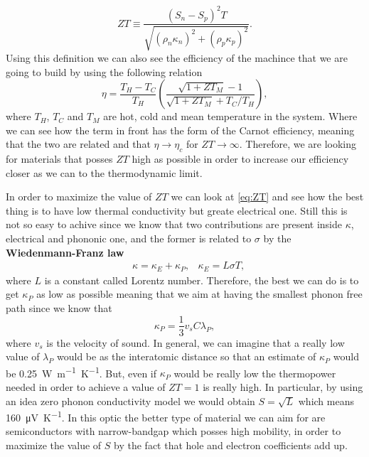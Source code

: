 \begin{equation}
    ZT \equiv \frac{\left( S_n - S_p \right)^2T}{\sqrt{\left( \rho_n\kappa_n \right)^2 + \left( \rho_p\kappa_p \right)^2}}.
\end{equation}
Using this definition we can also see the efficiency of the machince that we are going to build by using the following relation
\begin{equation}
    \eta = \frac{T_H - T_C}{T_H}\left( \frac{\sqrt{1 + ZT_M} - 1}{\sqrt{1 + ZT_M} + T_C/T_H} \right),
\end{equation}
where $T_H$, $T_C$ and $T_M$ are hot, cold and mean temperature in the system. Where we can see how the term in front has the form of the Carnot efficiency, meaning that the two are related and that $\eta \to \eta_{c}$ for $ZT \to \infty$. Therefore, we are looking for materials that posses $ZT$ high as possible in order to increase our efficiency closer as we can to the thermodynamic limit.

In order to maximize the value of $ZT$ we can look at \eqref{eq:ZT} and see how the best thing is to have low thermal conductivity but greate electrical one. Still this is not so easy to achive since we know that two contributions are present inside $\kappa$, electrical and phononic one, and the former is related to $\sigma$ by the \textbf{Wiedenmann-Franz law}
\begin{align}
    &\kappa = \kappa_E + \kappa_P, &\kappa_E = L\sigma T,
\end{align}  
where $L$ is a constant called Lorentz number. Therefore, the best we can do is to get $\kappa_P$ as low as possible meaning that we aim at having the smallest phonon free path since we know that
\begin{equation}
    \kappa_P = \frac{1}{3}v_sC\lambda_{P},
\end{equation}
where $v_s$ is the velocity of sound. In general, we can imagine that a really low value of $\lambda_P$ would be as the interatomic distance so that an estimate of $\kappa_P$ would be \SI{0.25}{W\metre^{-1}\kelvin^{-1}}. But, even if $\kappa_P$ would be really low the thermopower needed in order to achieve a value of $ZT = 1$ is really high. In particular, by using an idea zero phonon conductivity model we would obtain $S = \sqrt{L}$ which means \SI{160}{\micro\volt\kelvin^{-1}}. In this optic the better type of material we can aim for are semiconductors with narrow-bandgap which posses high mobility, in order to maximize the value of $S$ by the fact that hole and electron coefficients add up.